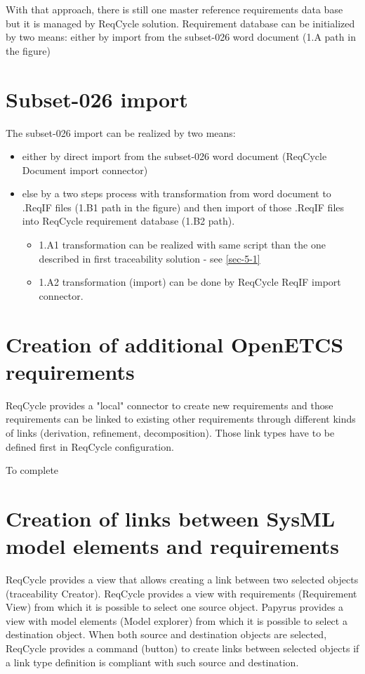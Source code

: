 \documentclass[11pt]{template/openetcs_report}
\begin{document}
With that approach, there is still one master reference requirements data base but it is managed by ReqCycle solution. Requirement database can be initialized by two means: either by import from the subset-026 word document (1.A path in the figure) 

\section{Subset-026 import}
\label{sec-6-1}
The subset-026 import can be realized by two means:
\begin{itemize}
\item either by direct import from the subset-026 word document (ReqCycle Document import connector)
\item else by a two steps process with transformation from word document to .ReqIF files (1.B1 path in the figure) and then import of those .ReqIF files into ReqCycle requirement database (1.B2 path).
	\begin{itemize}

	\item 1.A1 transformation can be realized with same script than the one described in first traceability solution - see \ref{sec-5-1}

	\item 1.A2 transformation (import) can be done by ReqCycle ReqIF import connector.
	\end{itemize}
\end{itemize}

\section{Creation of additional OpenETCS requirements}
\label{sec-6-2}
ReqCycle provides a "local" connector to create new requirements and those requirements can be linked to existing other requirements through different kinds of links (derivation, refinement, decomposition). Those link types have to be defined first in ReqCycle configuration.

To complete

\section{Creation of links between SysML model elements and requirements}
\label{sec-6-3}
ReqCycle provides a view that allows creating a link between two selected objects (traceability Creator).
ReqCycle provides a view with requirements (Requirement View) from which it is possible to select one source object.
Papyrus provides a view with model elements (Model explorer) from which it is possible to select a destination object.
When both source and destination objects are selected, ReqCycle provides a command (button) to create links between selected objects if a link type definition is compliant with such source and destination.
\end{document}
